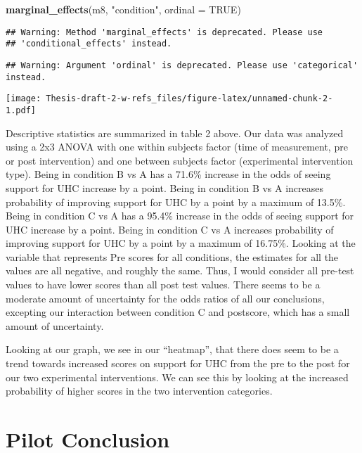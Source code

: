 \documentclass[
]{article}
\newenvironment{Shaded}{\begin{snugshade}}{\end{snugshade}}
\newcommand{\DataTypeTok}[1]{\textcolor[rgb]{0.13,0.29,0.53}{#1}}
\newcommand{\KeywordTok}[1]{\textcolor[rgb]{0.13,0.29,0.53}{\textbf{#1}}}
\newcommand{\NormalTok}[1]{#1}
\newcommand{\OtherTok}[1]{\textcolor[rgb]{0.56,0.35,0.01}{#1}}
\newcommand{\StringTok}[1]{\textcolor[rgb]{0.31,0.60,0.02}{#1}}
\begin{document}
\begin{Shaded}
\begin{Highlighting}[]
\KeywordTok{marginal_effects}\NormalTok{(m8, }\StringTok{"condition"}\NormalTok{, }\DataTypeTok{ordinal =} \OtherTok{TRUE}\NormalTok{)}
\end{Highlighting}
\end{Shaded}

\begin{verbatim}
## Warning: Method 'marginal_effects' is deprecated. Please use
## 'conditional_effects' instead.
\end{verbatim}

\begin{verbatim}
## Warning: Argument 'ordinal' is deprecated. Please use 'categorical' instead.
\end{verbatim}

\texttt{[image: Thesis-draft-2-w-refs\_files/figure-latex/unnamed-chunk-2-1.pdf]}

Descriptive statistics are summarized in table 2 above. Our data was
analyzed using a 2x3 ANOVA with one within subjects factor (time of
measurement, pre or post intervention) and one between subjects factor
(experimental intervention type). Being in condition B vs A has a 71.6\%
increase in the odds of seeing support for UHC increase by a point.
Being in condition B vs A increases probability of improving support for
UHC by a point by a maximum of 13.5\%. Being in condition C vs A has a
95.4\% increase in the odds of seeing support for UHC increase by a
point. Being in condition C vs A increases probability of improving
support for UHC by a point by a maximum of 16.75\%. Looking at the
variable that represents Pre scores for all conditions, the estimates
for all the values are all negative, and roughly the same. Thus, I would
consider all pre-test values to have lower scores than all post test
values. There seems to be a moderate amount of uncertainty for the odds
ratios of all our conclusions, excepting our interaction between
condition C and postscore, which has a small amount of uncertainty.

Looking at our graph, we see in our ``heatmap'', that there does seem to
be a trend towards increased scores on support for UHC from the pre to
the post for our two experimental interventions. We can see this by
looking at the increased probability of higher scores in the two
intervention categories.

\hypertarget{pilot-conclusion}{%
\section{Pilot Conclusion}\label{pilot-conclusion}}
\end{document}
